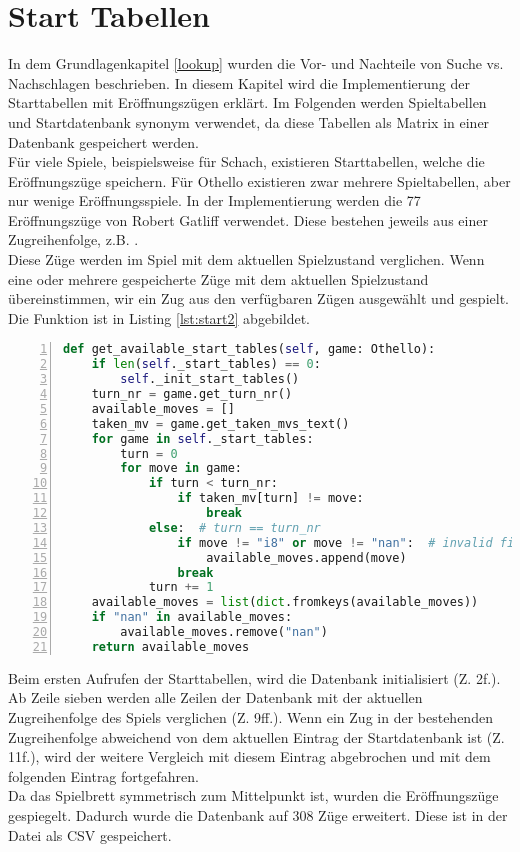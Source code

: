 \section{Start Tabellen}
In dem Grundlagenkapitel \ref{lookup} wurden die Vor- und Nachteile von Suche vs. Nachschlagen beschrieben. In diesem Kapitel wird die Implementierung der Starttabellen mit Eröffnungszügen erklärt. Im Folgenden werden Spieltabellen und Startdatenbank synonym verwendet, da diese Tabellen als Matrix in einer Datenbank gespeichert werden.
\\Für viele Spiele, beispielsweise für Schach, existieren Starttabellen, welche die  Eröffnungszüge speichern. Für Othello existieren zwar mehrere Spieltabellen, aber nur wenige Eröffnungsspiele. In der Implementierung werden die 77 Eröffnungszüge von Robert Gatliff \cite{open1} verwendet. Diese bestehen jeweils aus einer Zugreihenfolge, z.B. . 
\\Diese Züge werden im Spiel mit dem aktuellen Spielzustand verglichen. Wenn eine oder mehrere gespeicherte Züge mit dem aktuellen Spielzustand übereinstimmen, wir ein Zug aus den verfügbaren Zügen ausgewählt und gespielt. Die Funktion  ist in Listing \ref{lst:start2} abgebildet.
\begin{lstlisting}[caption = {Befüllen der Datenbank 2}, language = python, captionpos = t , numbers=left, label={lst:start2}]
def get_available_start_tables(self, game: Othello):
	if len(self._start_tables) == 0:
		self._init_start_tables()
	turn_nr = game.get_turn_nr()
	available_moves = []
	taken_mv = game.get_taken_mvs_text()
	for game in self._start_tables:
		turn = 0
		for move in game:
			if turn < turn_nr:
				if taken_mv[turn] != move:
					break
			else:  # turn == turn_nr
				if move != "i8" or move != "nan":  # invalid field
					available_moves.append(move)
				break
			turn += 1
	available_moves = list(dict.fromkeys(available_moves))
	if "nan" in available_moves:
		available_moves.remove("nan")
	return available_moves
\end{lstlisting}
Beim ersten Aufrufen der Starttabellen, wird die Datenbank initialisiert (Z. 2f.). Ab Zeile sieben werden alle Zeilen der Datenbank mit der aktuellen Zugreihenfolge des Spiels verglichen (Z. 9ff.). Wenn ein Zug in der bestehenden Zugreihenfolge abweichend von dem aktuellen Eintrag der Startdatenbank ist (Z. 11f.), wird der weitere Vergleich mit diesem Eintrag abgebrochen und mit dem folgenden Eintrag fortgefahren.
\\Da das Spielbrett symmetrisch zum Mittelpunkt ist, wurden die Eröffnungszüge gespiegelt. Dadurch wurde die Datenbank auf 308 Züge erweitert. Diese ist in der Datei  als CSV gespeichert.
